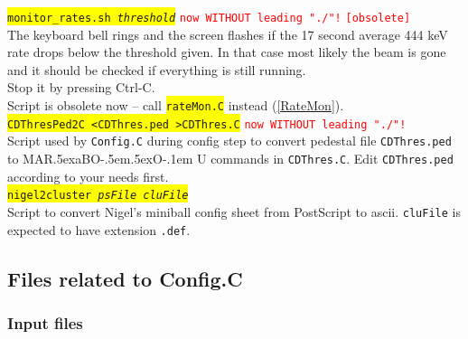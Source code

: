 \documentclass[10pt]{article}
\def\MARaBOU{MAR\lower.5ex\hbox{a}BO\kern-.5em\lower.5ex\hbox{O}\kern-.1em U}%
\newcommand{\yellow}[1]{\colorbox{yellow}{\texttt{#1}}}
\newcommand{\redt}[1]{\textcolor{red}{\texttt{#1}}}
\begin{document}
\yellow{monitor\_rates.sh \textit{threshold}} \redt{now WITHOUT leading "./"!} \redt{[obsolete]}\\

The keyboard bell rings and the screen flashes if the 17 second average
444 keV rate drops below the threshold given.  In that case most
likely the beam is gone and it should be checked if everything is
still running.\\
Stop it by pressing Ctrl-C.\\
Script is obsolete now -- call \yellow{rateMon.C} instead (\ref{RateMon}).\\

\yellow{CDThresPed2C <CDThres.ped >CDThres.C} \redt{now WITHOUT leading "./"!}\\

Script used by \texttt{Config.C} during config step to convert pedestal file \texttt{CDThres.ped} to \MARaBOU{} commands in
\texttt{CDThres.C}. Edit \texttt{CDThres.ped} according to your needs first.\\


\yellow{nigel2cluster \textit{psFile} \textit{cluFile}}\\

Script to convert Nigel's miniball config sheet from PostScript to ascii. \texttt{cluFile} is expected to have extension \texttt{.def}.

\newpage
\subsection{Files related to Config.C}
\subsubsection{Input files}\vspace{3mm}
\end{document}
